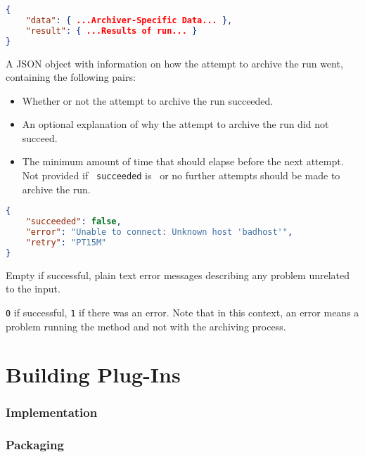 \documentclass[10pt,titlepage]{article}
\begin{document}
\example
\begin{lstlisting}[language=json,firstnumber=1]
{
    "data": { ...Archiver-Specific Data... },
    "result": { ...Results of run... }
}
\end{lstlisting}


 A JSON object with information on how
the attempt to archive the run went, containing the following pairs:

\begin{itemize}
\item {} Whether or not the attempt to archive
the run succeeded.
\item {} An optional explanation of why the
  attempt to archive the run did not succeed.
\item {} The minimum amount of time that
  should elapse before the next attempt.  Not provided if {\tt
    succeeded} is \true\  or no further attempts should be made to
  archive the run.
\end{itemize}

\example
\begin{lstlisting}[language=json,firstnumber=1]
{
    "succeeded": false,
    "error": "Unable to connect: Unknown host 'badhost'",
    "retry": "PT15M"
}
\end{lstlisting}


 Empty if successful, plain text error
messages describing any problem unrelated to the input.

 {\tt 0} if successful, {\tt 1} if there was
an error.  Note that in this context, an error means a problem running
the method and not with the archiving process.





\part{Building Plug-Ins}

\section{Implementation}

\section{Packaging}
\end{document}
